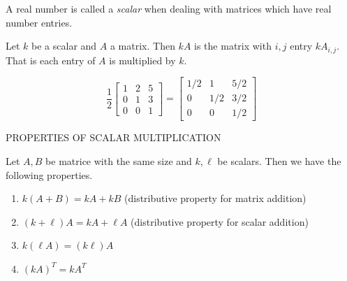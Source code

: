 \begin{definition}
    A real number is called a \emph{scalar} when dealing with matrices which have real number entries.
\end{definition}

\begin{definition}
    Let \(k\) be a scalar and \(A\) a matrix. Then \(kA\) is the matrix with \(i,j\) entry \(kA_{i,j}.\) That is each entry of \(A\) is multiplied by \(k.\)
\end{definition}

\begin{example}
    \[\frac{1}{2}\begin{bmatrix}
        1 & 2 & 5\\
        0 & 1 & 3 \\
        0 & 0 & 1
    \end{bmatrix} = \begin{bmatrix}
        1/2 & 1 & 5/2\\
        0 & 1/2 & 3/2 \\
        0 & 0 & 1/2
    \end{bmatrix}\]
\end{example}

PROPERTIES OF SCALAR MULTIPLICATION

Let \(A,B\) be matrice with the same size and \(k,\ell\) be scalars. Then we have the following properties.

\begin{enumerate}
    \item \(k\left(A+B\right) = kA+kB\) (distributive property for matrix addition)
    \item \(\left(k+\ell\right)A = kA+\ell A\) (distributive property for scalar addition)
    \item \(k\left(\ell A\right) = \left(k \ell\right)A\)
    \item \(\left(kA\right)^T = kA^{T}\)
\end{enumerate}